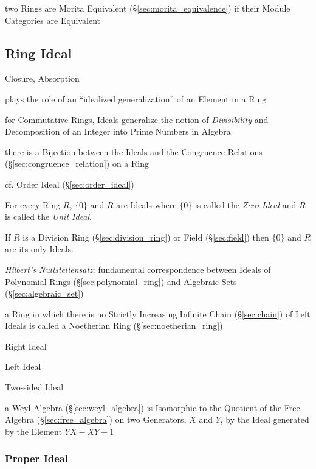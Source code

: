 \begin{itemize}
two Rings are Morita Equivalent (\S\ref{sec:morita_equivalence}) if their
Module Categories are Equivalent



\subsection{Ring Ideal}\label{sec:ring_ideal}

Closure, Absorption

plays the role of an ``idealized generalization'' of an Element in a Ring

for Commutative Rings, Ideals generalize the notion of \emph{Divisibility} and
Decomposition of an Integer into Prime Numbers in Algebra

there is a Bijection between the Ideals and the Congruence Relations
(\S\ref{sec:congruence_relation}) on a Ring

\fist cf. Order Ideal (\S\ref{sec:order_ideal})

For every Ring $R$, $\{0\}$ and $R$ are Ideals where $\{0\}$ is called
the \emph{Zero Ideal} and $R$ is called the \emph{Unit Ideal}.

If $R$ is a Division Ring (\S\ref{sec:division_ring}) or Field
(\S\ref{sec:field}) then $\{0\}$ and $R$ are its only Ideals.

\emph{Hilbert's Nullstellensatz}: fundamental correspondence between Ideals of
Polynomial Rings (\S\ref{sec:polynomial_ring}) and Algebraic Sets
(\S\ref{sec:algebraic_set})

a Ring in which there is no Strictly Increasing Infinite Chain
(\S\ref{sec:chain}) of Left Ideals is called a Noetherian Ring
(\S\ref{sec:noetherian_ring})

Right Ideal

Left Ideal

Two-sided Ideal

\fist a Weyl Algebra (\S\ref{sec:weyl_algebra}) is Isomorphic to the Quotient
of the Free Algebra (\S\ref{sec:free_algebra}) on two Generators, $X$ and $Y$,
by the Ideal generated by the Element $YX - XY - 1$



\subsubsection{Proper Ideal}\label{sec:proper_ideal}


\end{itemize}
